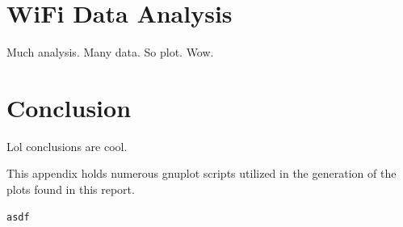 \documentclass[journal,twocolumn]{IEEEtran}
\begin{document}
\section{WiFi Data Analysis}

Much analysis. Many data. So plot. Wow.

\section{Conclusion}

Lol conclusions are cool.


This appendix holds numerous gnuplot scripts utilized in the 
generation of the plots found in this report.

\begin{lstlisting}
asdf
\end{lstlisting}
\end{document}
